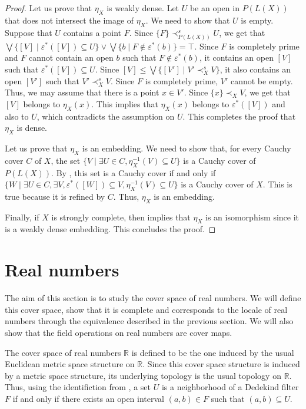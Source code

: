 \documentclass[reqno]{amsart}
\theoremstyle{definition}
\theoremstyle{remark}
\numberwithin{figure}{section}
\newcommand{\rb}{\prec}
\begin{document}
\begin{proof}
Let us prove that $\eta_X$ is weakly dense.
Let $U$ be an open in $P(L(X))$ that does not intersect the image of $\eta_X$.
We need to show that $U$ is empty.
Suppose that $U$ contains a point $F$.
Since $\{ F \} \rb^s_{P(L(X))} U$, we get that $\bigvee \{ [V] \mid \varepsilon^*([V]) \subseteq U \} \vee \bigvee \{ b \mid F \notin \varepsilon^*(b) \} = \top$.
Since $F$ is completely prime and $F$ cannot contain an open $b$ such that $F \notin \varepsilon^*(b)$, it contains an open $[V]$ such that $\varepsilon^*([V]) \subseteq U$.
Since $[V] \leq \bigvee \{ [V'] \mid V' \rb^s_X V \}$, it also contains an open $[V']$ such that $V' \rb^s_X V$.
Since $F$ is completely prime, $V'$ cannot be empty.
Thus, we may assume that there is a point $x \in V'$.
Since $\{ x \} \rb_X V$, we get that $[V]$ belongs to $\eta_X(x)$.
This implies that $\eta_X(x)$ belongs to $\varepsilon^*([V])$ and also to $U$, which contradicts the assumption on $U$.
This completes the proof that $\eta_X$ is dense.

Let us prove that $\eta_X$ is an embedding.
We need to show that, for every Cauchy cover $C$ of $X$, the set $\{ V \mid \exists U \in C, \eta_X^{-1}(V) \subseteq U \}$ is a Cauchy cover of $P(L(X))$.
By , this set is a Cauchy cover if and only if $\{ W \mid \exists U \in C, \exists V, \varepsilon^*([W]) \subseteq V, \eta_X^{-1}(V) \subseteq U \}$ is a Cauchy cover of $X$.
This is true because it is refined by $C$.
Thus, $\eta_X$ is an embedding.

Finally, if $X$ is strongly complete, then  implies that $\eta_X$ is an isomorphism since it is a weakly dense embedding.
This concludes the proof.
\end{proof}

\section{Real numbers}
\label{sec:reals}

The aim of this section is to study the cover space of real numbers.
We will define this cover space, show that it is complete and corresponds to the locale of real numbers through the equivalence described in the previous section.
We will also show that the field operations on real numbers are cover maps.

The cover space of real numbers $\mathbb{R}$ is defined to be the one induced by the usual Euclidean metric space structure on $\mathbb{R}$.
Since this cover space structure is induced by a metric space structure, its underlying topology is the usual topology on $\mathbb{R}$.
Thus, using the identifiction from , a set $U$ is a neighborhood of a Dedekind filter $F$ if and only if there exists an open interval $(a,b) \in F$ such that $(a,b) \subseteq U$.
\end{document}
